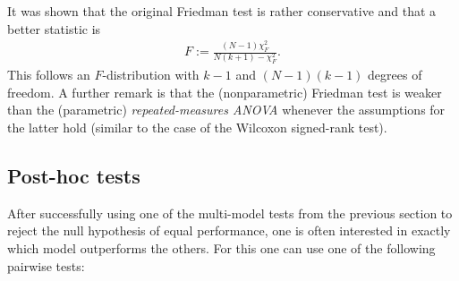     \begin{remark}
        It was shown that the original Friedman test is rather conservative and that a better statistic is
        \begin{gather}
            F := \frac{(N-1)\chi^2_F}{N(k+1)-\chi^2_F}.
        \end{gather}
        This follows an $F$-distribution with $k-1$ and $(N-1)(k-1)$ degrees of freedom. A further remark is that the (nonparametric) Friedman test is weaker than the (parametric) \textit{repeated-measures ANOVA} whenever the assumptions for the latter hold (similar to the case of the Wilcoxon signed-rank test).
    \end{remark}

\subsection{Post-hoc tests}

    After successfully using one of the multi-model tests from the previous section to reject the null hypothesis of equal performance, one is often interested in exactly which model outperforms the others. For this one can use one of the following pairwise tests:

